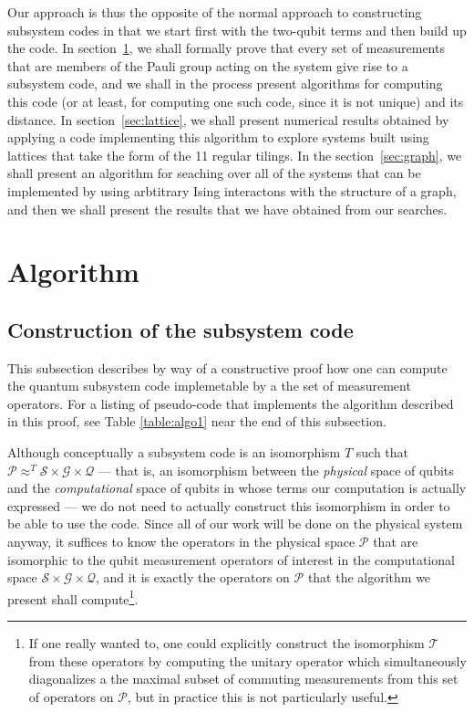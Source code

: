 \documentclass[twocolumn,showpacs,preprintnumbers,amsmath,amssymb,nofootinbib,pra,floatfix]{revtex4-1}
\newenvironment{remark}[1][Remark]{\begin{trivlist}
\item[\hskip \labelsep {\bfseries #1}]}{\end{trivlist}}
\begin{document}
Our approach is thus the opposite of the normal approach to constructing subsystem codes in that we start first with the two-qubit terms and then build up the code.  In section~\ref{sec:algorithm}, we shall formally prove that every set of measurements that are members of the Pauli group acting on the system give rise to a subsystem code, and we shall in the process present algorithms for computing this code (or at least, for computing one such code, since it is not unique) and its distance.  In section~\ref{sec:lattice}, we shall present numerical results obtained by applying a code implementing this algorithm to explore systems built using lattices that take the form of the 11 regular tilings.  In the section~\ref{sec:graph}, we shall present an algorithm for seaching over all of the systems that can be implemented by using arbtitrary Ising interactons
with the structure of a graph, and then we shall present the results that we have obtained from our searches.

\section{Algorithm} \label{sec:algorithm}

\subsection{Construction of the subsystem code}

\begin{remark}
This subsection describes by way of a constructive proof how one can compute the quantum subsystem code implemetable by a the set of measurement operators.  For a listing of pseudo-code that implements the algorithm described in this proof, see Table \ref{table:algo1} near the end of this subsection.
\end{remark}
Although conceptually a subsystem code is an isomorphism $T$ such that  $\mathscr{P}\approx^T \mathscr{S}\times\mathscr{G}\times\mathscr{Q}$ --- that is, an isomorphism between the \emph{physical} space of qubits and the \emph{computational} space of qubits in whose terms our computation is actually expressed --- we do not need to actually construct this isomorphism in order to be able to use the code.  Since all of our work will be done on the physical system anyway, it suffices to know the operators in the physical space $\mathscr{P}$ that are isomorphic to the qubit measurement operators of interest in the computational space $\mathscr{S}\times\mathscr{G}\times\mathscr{Q}$, and it is exactly the operators on $\mathscr{P}$ that the algorithm we present shall compute\footnote{If one really wanted to, one could explicitly construct the isomorphism $\mathscr{T}$ from these operators by computing the unitary operator which simultaneously diagonalizes a the maximal subset of commuting measurements from this set of operators on $\mathscr{P}$, but in practice this is not particularly useful.}.
\end{document}
